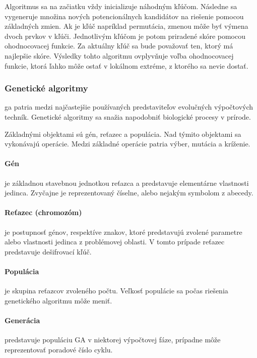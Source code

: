 Algoritmus sa na začiatku vždy inicializuje náhodným kľúčom. Následne sa vygeneruje množina nových potencionálnych kandidátov na riešenie
pomocou základných zmien. Ak je kľúč napríklad permutácia, zmenou môže byť výmena dvoch prvkov v kľúči.
Jednotlivým kľúčom je potom priradené skóre pomocou ohodnocovacej funkcie.
Za aktuálny kľúč sa bude považovať ten, ktorý má najlepšie skóre.
Výsledky tohto algoritmu ovplyvňuje voľba ohodnocovacej funkcie, ktorá ľahko môže ostať v lokálnom extréme, z ktorého sa nevie dostať.

\subsubsection{Genetické algoritmy}
\acrfull{ga} patria medzi najčastejšie používaných predstaviteľov evolučných výpočtových techník.
Genetické algoritmy sa snažia napodobniť biologické procesy v prírode.

Základnými objektami sú gén, reťazec a populácia. Nad týmito objektami sa vykonávajú operácie.
Medzi základné operácie patria výber, mutácia a kríženie.

\paragraph{Gén} je základnou stavebnou jednotkou reťazca a predstavuje elementárne vlastnosti jedinca.
Zvyčajne je reprezentovaný číselne, alebo nejakým symbolom z abecedy.

\paragraph{Reťazec (chromozóm)} je postupnosť génov, respektíve znakov, ktoré predstavujú zvolené parametre alebo vlastnosti jedinca
z problémovej oblasti. V tomto prípade reťazec predstavuje dešifrovací kľúč. 

\paragraph{Populácia} je skupina reťazcov zvoleného počtu. Veľkosť populácie sa počas riešenia genetického algoritmu môže meniť.

\paragraph{Generácia} predstavuje populáciu GA v niektorej výpočtovej fáze, prípadne môže reprezentovať poradové číslo cyklu.

